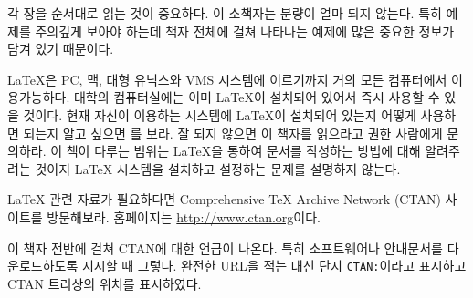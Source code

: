 \bigskip

\noindent 각 장을 순서대로 읽는 것이 중요하다. 이 소책자는 분량이 얼마 되지 않는다.
특히 예제를 주의깊게 보아야 하는데 책자 전체에 걸쳐 나타나는 예제에 많은 중요한 정보가 담겨 있기 때문이다.

\bigskip
\noindent \LaTeX 은 PC, 맥, 대형 유닉스와 VMS 시스템에 이르기까지 거의 모든 컴퓨터에서 이용가능하다. 
대학의 컴퓨터실에는 이미 \LaTeX 이 설치되어 있어서 즉시 사용할 수 있을 것이다.
현재 자신이 이용하는 시스템에 \LaTeX 이 설치되어 있는지 어떻게 사용하면 되는지 알고 싶으면 \guide 를 보라. 
잘 되지 않으면 이 책자를 읽으라고 권한 사람에게 문의하라.
이 책이 다루는 범위는 \LaTeX 을 통하여 문서를 작성하는 방법에 대해 알려주려는 것이지 \LaTeX{} 시스템을 설치하고 설정하는 문제를 설명하지 않는다.

\bigskip

\noindent \LaTeX{} 관련 자료가 필요하다면 Comprehensive \TeX{} Archive Network (CTAN) 사이트를 방문해보라. 홈페이지는 \url{http://www.ctan.org}이다.

이 책자 전반에 걸쳐 CTAN에 대한 언급이 나온다. 특히 소프트웨어나 안내문서를 다운로드하도록 지시할 때 그렇다. 완전한 URL을 적는 대신 단지 \texttt{CTAN:}이라고 표시하고 CTAN 트리상의 위치를 표시하였다.


